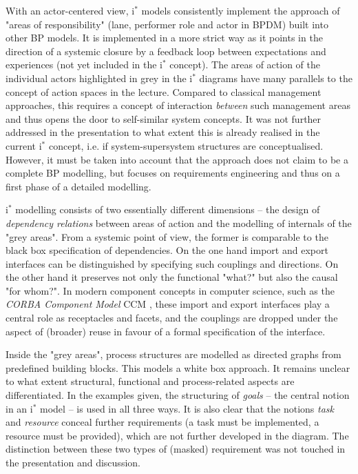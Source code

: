 \documentclass[11pt,a4paper]{article}
\begin{document}
With an actor-centered view, i$^\ast$ models consistently implement the
approach of "areas of responsibility" (lane, performer role and actor in BPDM)
built into other BP models. It is implemented in a more strict way as it
points in the direction of a systemic closure by a feedback loop between
expectations and experiences (not yet included in the i$^\ast$ concept). The
areas of action of the individual actors highlighted in grey in the i$^\ast$
diagrams have many parallels to the concept of action spaces in the lecture.
Compared to classical management approaches, this requires a concept of
interaction \emph{between} such management areas and thus opens the door to
self-similar system concepts. It was not further addressed in the presentation
to what extent this is already realised in the current i$^\ast$ concept,
i.e. if system-supersystem structures are conceptualised. However, it must be
taken into account that the approach does not claim to be a complete BP
modelling, but focuses on requirements engineering and thus on a first phase
of a detailed modelling.

i$^\ast$ modelling consists of two essentially different dimensions -- the
design of \emph{dependency relations} between areas of action and the
modelling of internals of the "grey areas". From a systemic point of view, the
former is comparable to the black box specification of dependencies. On the
one hand import and export interfaces can be distinguished by specifying such
couplings and directions. On the other hand it preserves not only the
functional "what?" but also the causal "for whom?". In modern component
concepts in computer science, such as the \emph{CORBA Component Model} CCM
\cite{CCM}, these import and export interfaces play a central role as
receptacles and facets, and the couplings are dropped under the aspect of
(broader) reuse in favour of a formal specification of the interface.

Inside the "grey areas", process structures are modelled as directed graphs
from predefined building blocks. This models a white box approach.  It remains
unclear to what extent structural, functional and process-related aspects are
differentiated. In the examples given, the structuring of \emph{goals} -- the
central notion in an i$^\ast$ model -- is used in all three ways. It is also
clear that the notions \emph{task} and \emph{resource} conceal further
requirements (a task must be implemented, a resource must be provided), which
are not further developed in the diagram. The distinction between these two
types of (masked) requirement was not touched in the presentation and
discussion.
\end{document}
